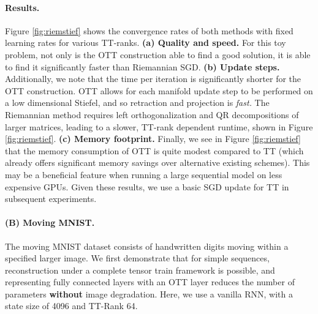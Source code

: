 \paragraph{Results.} Figure \ref{fig:riemstief} shows the
convergence rates of both methods with fixed learning rates for various TT-ranks.
\textbf{(a) Quality and speed.} For this toy problem, not only is the OTT construction able to find a good solution, it is able to find it significantly faster than Riemannian SGD.
\textbf{(b) Update steps.} Additionally, we note that the time per iteration is significantly shorter for the OTT construction.
OTT allows for each manifold update step to be performed on a low dimensional Stiefel,
and so retraction and projection is \textit{fast.}
The Riemannian method requires left orthogonalization and QR decompositions
of larger matrices, leading to a slower, TT-rank dependent runtime, shown in Figure \ref{fig:riemstief}.
\textbf{(c) Memory footprint.} Finally, we see in Figure \ref{fig:riemstief} that the memory consumption of OTT is quite modest compared to TT (which already offers
significant memory savings over alternative existing schemes). This may be a beneficial feature
when running a large sequential model on less expensive GPUs. 
Given these results, we use a basic SGD update for TT in subsequent experiments. 

\paragraph{(B) Moving MNIST.}
The moving MNIST dataset \cite{srivastava2015unsupervised} consists of handwritten digits moving within a specified larger image.
We first demonstrate that
for simple sequences, reconstruction under a complete tensor train framework is possible,
and representing fully connected layers with an OTT layer
reduces the number of parameters \textbf{without} image degradation.
Here, we use a vanilla RNN, with a state size of 4096 and TT-Rank 64.

